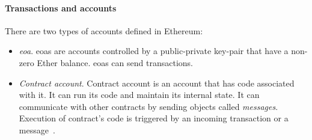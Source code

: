 \paragraph{Transactions and accounts}
There are two types of accounts defined in Ethereum:
\begin{itemize}[noitemsep]
    \item \textit{\acrfull{eoa}}. \acrshort{eoa}s are accounts controlled by a public-private key-pair that have a non-zero Ether balance. \acrshort{eoa}s can send transactions.~\cite{EthereumCommunityEthereumDocumentation}
    \item \textit{Contract account}. Contract account is an account that has code associated with it. It can run its code and maintain its internal state. It can communicate with other contracts by sending objects called \textit{messages}. Execution of contract's code is triggered by an incoming transaction or a message~\cite{EthereumCommunityEthereumDocumentation}.
\end{itemize}


